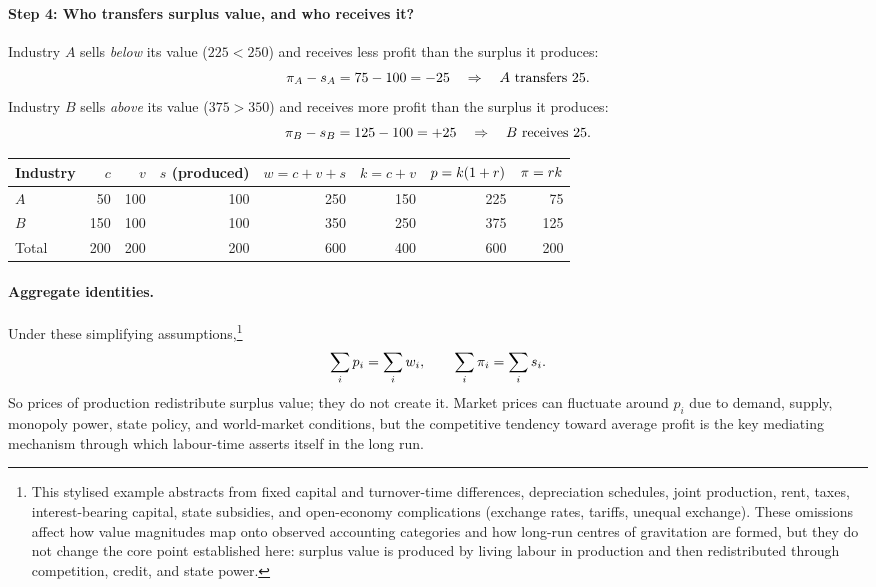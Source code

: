 \begin{example}
\paragraph{Step 4: Who transfers surplus value, and who receives it?}
Industry $A$ sells \emph{below} its value ($225<250$) and receives less profit than the surplus it produces:
\[
  \pi_A-s_A = 75-100 = -25 \quad\Rightarrow\quad \text{$A$ transfers 25.}
\]
Industry $B$ sells \emph{above} its value ($375>350$) and receives more profit than the surplus it produces:
\[
  \pi_B-s_B = 125-100 = +25 \quad\Rightarrow\quad \text{$B$ receives 25.}
\]

\medskip
\begingroup
\setlength{\tabcolsep}{6pt}
\renewcommand{\arraystretch}{1.15}
\begin{center}
\begin{tabular}{@{}lrrrrrrr@{}}
\toprule
Industry & $c$ & $v$ & $s$ (produced) & $w=c+v+s$ & $k=c+v$ & $p=k(1+r)$ & $\pi=r k$ \\
\midrule
$A$ & 50  & 100 & 100 & 250 & 150 & 225 & 75  \\
$B$ & 150 & 100 & 100 & 350 & 250 & 375 & 125 \\
\midrule
Total & 200 & 200 & 200 & 600 & 400 & 600 & 200 \\
\bottomrule
\end{tabular}
\end{center}
\endgroup

\paragraph{Aggregate identities.}
Under these simplifying assumptions,\footnote{This stylised example abstracts from fixed capital and turnover-time differences, depreciation schedules, joint production, rent, taxes, interest-bearing capital, state subsidies, and open-economy complications (exchange rates, tariffs, unequal exchange). These omissions affect how value magnitudes map onto observed accounting categories and how long-run centres of gravitation are formed, but they do not change the core point established here: surplus value is produced by living labour in production and then redistributed through competition, credit, and state power.}
\[
  \sum_i p_i = \sum_i w_i,
  \qquad
  \sum_i \pi_i = \sum_i s_i.
\]
So prices of production redistribute surplus value; they do not create it. Market prices can
fluctuate around $p_i$ due to demand, supply, monopoly power, state policy, and world-market
conditions, but the competitive tendency toward average profit is the key mediating mechanism
through which labour-time asserts itself in the long run.\cite{Marx1894,Shaikh2016}


\end{example}
